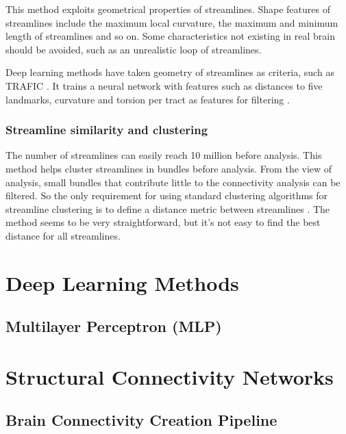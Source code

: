 This method exploits geometrical properties of streamlines.
Shape features of streamlines include the maximum local curvature, the maximum and minimum length of streamlines and so on. 
Some characteristics not existing in real brain should be avoided, such as an unrealistic loop of streamlines. 

Deep learning methods have taken geometry of streamlines as criteria, such as TRAFIC \cite*{lamTRAFICFiberTract2018}. 
It trains a neural network with features such as distances to five landmarks, curvature and torsion per tract as features for filtering \cite*{lamTRAFICFiberTract2018}.

\subsubsection{Streamline similarity and clustering}

The number of streamlines can easily reach 10 million before analysis. 
This method helps cluster streamlines in bundles before analysis. 
From the view of analysis, small bundles that contribute little to the connectivity analysis can be filtered. 
So the only requirement for using standard clustering algorithms for streamline clustering 
is to define a distance metric between streamlines \cite*[]{ozarslanAnisotropyFieldsScales2021}.
The method seems to be very straightforward, but it's not easy to find the best distance for all streamlines.


\section{Deep Learning Methods}
\subsection{Multilayer Perceptron (MLP)}

\section{Structural Connectivity Networks}


\subsection{Brain Connectivity Creation Pipeline}
